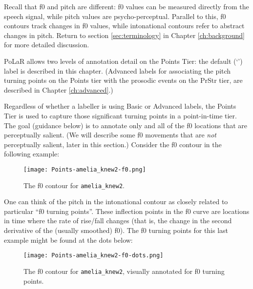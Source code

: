 \begin{infobox}[frametitle=\textbf{A NOTE ON TERMINOLOGY}]
Recall that f0 and pitch are different: f0 values can be measured directly from the speech signal, while pitch values are psycho-perceptual. Parallel to this, f0 contours track changes in f0 values, while intonational contours refer to abstract changes in pitch. Return to section \ref{sec:terminology} in Chapter \ref{ch:background} for more detailed discussion.\label{terminology f0 pitch}
\end{infobox}

PoLaR allows two levels of annotation detail on the Points Tier: the default (‘’) label is described in this chapter. (Advanced labels for associating the pitch turning points on the Points tier with the prosodic events on the PrStr tier, are described in Chapter \ref{ch:advanced}.)

Regardless of whether a labeller is using Basic or Advanced labels, the Points Tier is used to capture those significant turning points in a point-in-time tier. The goal (guidance below) is to annotate only and all of the f0 locations that are perceptually salient. (We will describe some f0 movements that are \emph{not} perceptually salient, later in this section.) Consider the f0 contour in the following example:

\begin{figure}[H]
\centering
%
\texttt{[image: Points-amelia\_knew2-f0.png]}
%
\caption{The f0 contour for \texttt{amelia\_knew2}.%
\label{fig:amelia_knew2 f0 contour}%
}
\end{figure}

One can think of the pitch in the intonational contour as closely related to particular “f0 turning points”. These inflection points in the f0 curve are locations in time where the rate of rise\slash fall changes (that is, the change in the second derivative of the (usually smoothed) f0). The f0 turning points for this last example might be found at the dots below:

\begin{figure}[H]
\centering
%
\texttt{[image: Points-amelia\_knew2-f0-dots.png]}
%
\caption{The f0 contour for \texttt{amelia\_knew2}, visually annotated for f0 turning points.%
\label{fig:amelia_knew2 f0 contour turning points}%
}
\end{figure}

